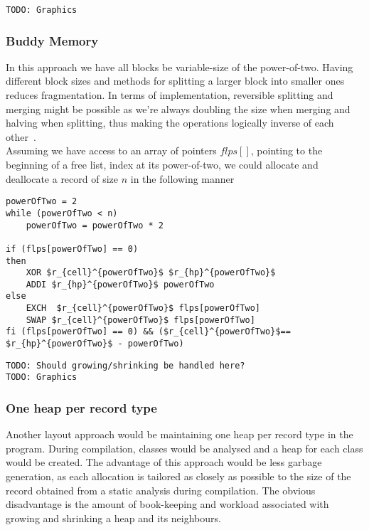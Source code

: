 \texttt{TODO: Graphics}


\subsubsection{Buddy Memory}
In this approach we have all blocks be variable-size of the power-of-two. Having different block sizes and methods for splitting a larger block into smaller ones reduces fragmentation. In terms of implementation, reversible splitting and merging might be possible as we're always doubling the size when merging and halving when splitting, thus making the operations logically inverse of each other~\cite{dk:buddyalloc}.\\

Assuming we have access to an array of pointers $flps[]$, pointing to the beginning of a free list, index at its power-of-two, we could allocate and deallocate a record of size $n$ in the following manner
\begin{lstlisting}[mathescape=true, frame=single, caption={Allocating and deallocating records of size $n$ using Buddy Memory}, captionpos=b, language=janus]
powerOfTwo = 2
while (powerOfTwo < n)
	powerOfTwo = powerOfTwo * 2
	
if (flps[powerOfTwo] == 0) 
then
	XOR $r_{cell}^{powerOfTwo}$ $r_{hp}^{powerOfTwo}$
	ADDI $r_{hp}^{powerOfTwo}$ powerOfTwo 
else
	EXCH  $r_{cell}^{powerOfTwo}$ flps[powerOfTwo]
	SWAP $r_{cell}^{powerOfTwo}$ flps[powerOfTwo]
fi (flps[powerOfTwo] == 0) && ($r_{cell}^{powerOfTwo}$== $r_{hp}^{powerOfTwo}$ - powerOfTwo)
\end{lstlisting}

\texttt{TODO: Should growing/shrinking be handled here?}\\

\texttt{TODO: Graphics}

\subsubsection{One heap per record type}
Another layout approach would be maintaining one heap per record type in the program. During compilation, classes would be analysed and a heap for each class would be created. The advantage of this approach would be less garbage generation, as each allocation is tailored as closely as possible to the size of the record obtained from a static analysis during compilation. The obvious disadvantage is the amount of book-keeping and workload associated with growing and shrinking a heap and its neighbours.

